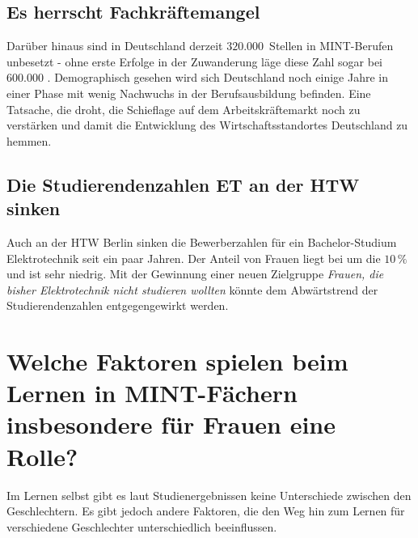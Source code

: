 \documentclass[a4paper, 12 pt]{IEEEtran}
\begin{document}
\subsection{Es herrscht Fachkräftemangel}
Darüber hinaus sind in Deutschland derzeit $320.000$~Stellen in MINT-Berufen unbesetzt - ohne erste Erfolge in der Zuwanderung läge diese Zahl sogar bei $600.000$ \cite{}. Demographisch gesehen wird sich Deutschland noch einige Jahre in einer Phase mit wenig Nachwuchs in der Berufsausbildung befinden. Eine Tatsache, die droht, die Schieflage auf dem Arbeitskräftemarkt noch zu verstärken und damit die Entwicklung des Wirtschaftsstandortes Deutschland zu hemmen. 

\subsection{Die Studierendenzahlen ET an der HTW sinken} 
Auch an der HTW Berlin sinken die Bewerberzahlen für ein Bachelor-Studium Elektrotechnik seit ein paar Jahren. Der Anteil von Frauen liegt bei um die $10\,\%$ und ist sehr niedrig.
Mit der Gewinnung einer neuen Zielgruppe \emph{Frauen, die bisher Elektrotechnik nicht studieren wollten} könnte dem Abwärtstrend der Studierendenzahlen entgegengewirkt werden.  







\section{Welche Faktoren spielen beim Lernen in MINT-Fächern insbesondere für 
Frauen eine Rolle?}
\label{sec:LernfaktorenBeiFrauen}


Im Lernen selbst gibt es laut Studienergebnissen keine Unterschiede zwischen den Geschlechtern. 
Es gibt jedoch andere Faktoren, die den Weg hin zum Lernen für verschiedene Geschlechter unterschiedlich beeinflussen. 
\end{document}
